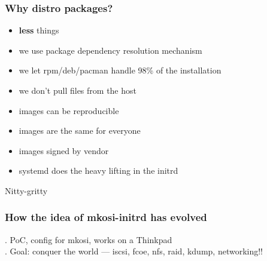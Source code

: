 \documentclass[]{beamer}
\newcommand\pp\pause
\newcommand{\secsec}[1]{\begin{frame}[c]\Huge \textsc #1\end{frame}}
\begin{document}
\begin{frame}
  \frametitle{Why distro packages?}

  \begin{itemize}
    \pp
  \item \textbf{less} things
    \pp
  \item we use package dependency resolution mechanism
    \pp
  \item we let rpm/deb/pacman handle 98\% of the installation
    \pp
  \item we don't pull files from the host
    \pp
  \item images can be reproducible
    \pp
  \item images are the same for everyone
    \pp
  \item images signed by vendor
    \pp
  \item systemd does the heavy lifting in the initrd
  \end{itemize}
\end{frame}






\secsec{Nitty-gritty}

\begin{frame}[fragile]
  \frametitle{How the idea of mkosi-initrd has evolved}

  \pp
  0. PoC, config for mkosi, works on a Thinkpad
  \\

  \pp
  1. Goal: conquer the world — iscsi, fcoe, nfs, raid, kdump, networking!!
\end{frame}
\end{document}
